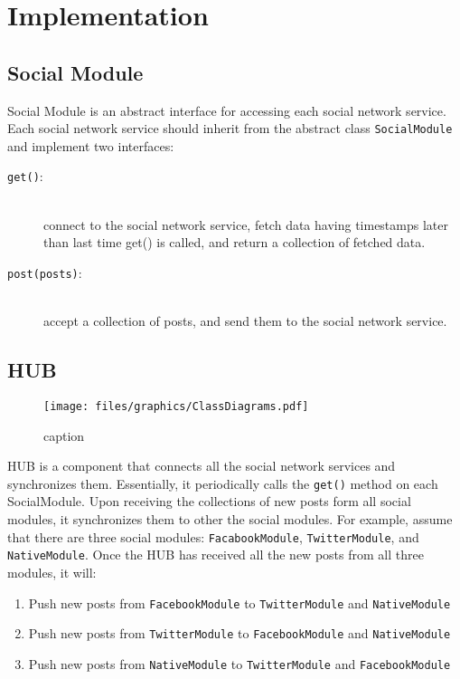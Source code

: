 %
%

\chapter{Implementation} %
\label{cha:implementation}

\section{Social Module} %
\label{sec:social_module}

Social Module is an abstract interface for accessing each social network service. Each social network service should inherit from the abstract class \texttt{SocialModule} and implement two interfaces:
\begin{description}
	\item[\texttt{get()}:] \hfill \\ 
	connect to the social network service, fetch data having timestamps later than last time get() is called, and return a collection of fetched data.
	\item[\texttt{post(posts)}:] \hfill \\
	 accept a collection of posts, and send them to the social network service.
\end{description}


\section{HUB} %
\label{sec:hub}

\begin{figure}[htbp]
	\centering
		\texttt{[image: files/graphics/ClassDiagrams.pdf]}
	\caption{caption}
	\label{fig:graphics_ClassDiagrams}
\end{figure}

HUB is a component that connects all the social network services and synchronizes them. Essentially, it periodically calls the \texttt{get()} method on each SocialModule. Upon receiving the collections of new posts form all social modules, it synchronizes them to other the social modules. For example, assume that there are three social modules: \texttt{FacabookModule}, \texttt{TwitterModule}, and \texttt{NativeModule}. Once the HUB has received all the new posts from all three modules, it will:
\begin{enumerate}
	\item Push new posts from \texttt{FacebookModule} to \texttt{TwitterModule} and \texttt{NativeModule}
	\item Push new posts from \texttt{TwitterModule} to \texttt{FacebookModule} and \texttt{NativeModule}
	\item Push new posts from \texttt{NativeModule} to \texttt{TwitterModule} and \texttt{FacebookModule}
\end{enumerate}

